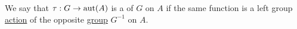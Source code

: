 \begin{Definition}\label{def:right_group_action}
  We say that \( \tau: G \to \operatorname{aut}(A) \) is a  of \( G \) on \( A \) if the same function is a left group \hyperref[def:left_group_action]{action} of the opposite \hyperref[def:opposite_group]{group} \( G^{-1} \) on \( A \).
\end{Definition}
